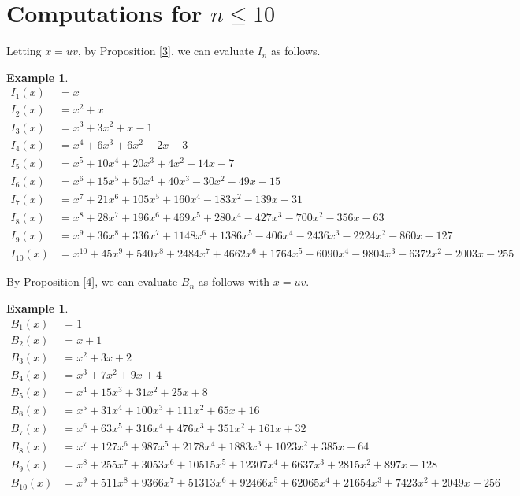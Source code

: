 \documentclass[11pt]{amsart}
\numberwithin{equation}{section}
\theoremstyle{definition}
\newtheorem{exam}[theo]{Example}
\begin{document}
\bigskip

\section{Computations for $n\le 10$}
Letting $x=uv$, by Proposition \ref{3}, we can evaluate $I_n$ as follows. 
\begin{exam}\label{5}
\begin{align*}
I_1(x) &= x \\
I_2(x) &= x^2 + x \\
I_3(x) &= x^3 + 3x^2 + x - 1 \\
I_4(x) &= x^4 + 6x^3 + 6x^2 - 2x - 3 \\
I_5(x) &= x^5 + 10x^4 + 20x^3 + 4x^2 - 14x - 7 \\
I_6(x) &= x^6 + 15x^5 + 50x^4 + 40x^3 - 30x^2 - 49x - 15 \\
I_7(x) &= x^7 + 21x^6 + 105x^5 + 160x^4 - 183x^2 - 139x - 31 \\
I_8(x) &= x^8 + 28x^7 + 196x^6 + 469x^5 + 280x^4 - 427x^3 - 700x^2 - 356x - 63 \\
I_9(x) &= x^9 + 36x^8 + 336x^7 + 1148x^6 + 1386x^5 - 406x^4 - 2436x^3 - 2224x^2 - 860x - 127 \\
I_{10}(x) &= x^{10} + 45x^9 + 540x^8 + 2484x^7 + 4662x^6 + 1764x^5 - 6090x^4 - 9804x^3 - 6372x^2 - 2003x - 255
\end{align*}
\end{exam}

\medskip

By Proposition \ref{4}, we can evaluate $B_n$ as follows with $x=uv$. 
\begin{exam}\label{6}
\begin{align*}
B_1(x) &= 1 \\
B_2(x) &= x + 1 \\
B_3(x) &= x^2 + 3x + 2 \\
B_4(x) &= x^3 + 7x^2 + 9x + 4 \\
B_5(x) &= x^4 + 15x^3 + 31x^2 + 25x + 8 \\
B_6(x) &= x^5 + 31x^4 + 100x^3 + 111x^2 + 65x + 16 \\
B_7(x) &= x^6 + 63x^5 + 316x^4 + 476x^3 + 351x^2 + 161x + 32 \\
B_8(x) &= x^7 + 127x^6 + 987x^5 + 2178x^4 + 1883x^3 + 1023x^2 + 385x + 64 \\
B_9(x) &= x^8 + 255x^7 + 3053x^6 + 10515x^5 + 12307x^4 + 6637x^3 + 2815x^2 + 897x + 128 \\
B_{10}(x) &= x^9 + 511x^8 + 9366x^7 + 51313x^6 + 92466x^5 + 62065x^4 + 21654x^3 + 7423x^2 + 2049x + 256
\end{align*}
\end{exam}
\end{document}
